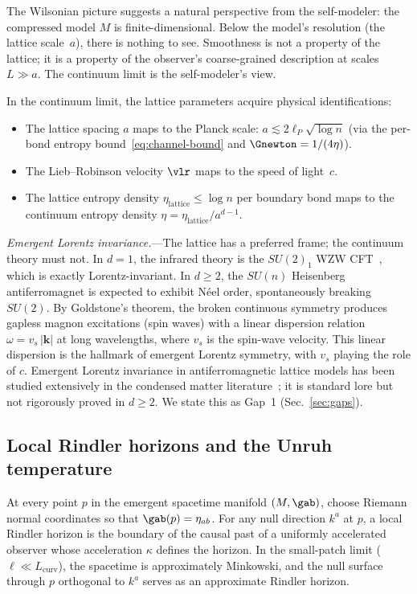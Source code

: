 The Wilsonian picture suggests a natural perspective from the
self-modeler:  the compressed model $M$ is finite-dimensional.  Below
the model's resolution (the lattice scale~$a$), there is nothing to
see.  Smoothness is not a property of the lattice; it is a property of
the observer's coarse-grained description at scales $L \gg a$.  The
continuum limit is the self-modeler's view.

In the continuum limit, the lattice parameters acquire physical
identifications:
\begin{itemize}
\item The lattice spacing $a$ maps to the Planck scale:
  $a \lesssim 2\ell_P \sqrt{\log n}$ (via the per-bond entropy
  bound~\eqref{eq:channel-bound} and
  $\Gnewton = 1/(4\eta)$).
\item The Lieb--Robinson velocity $\vlr$ maps to the speed of
  light~$c$.
\item The lattice entropy density
  $\eta_{\mathrm{lattice}} \leq \log n$ per boundary bond maps to
  the continuum entropy density
  $\eta = \eta_{\mathrm{lattice}}/a^{d-1}$.
\end{itemize}

\emph{Emergent Lorentz invariance.}---The lattice has a preferred frame;
the continuum theory must not.  In $d = 1$, the infrared theory is the
$SU(2)_1$ WZW CFT~\cite{Affleck1986, AffleckHaldane1987}, which is
exactly Lorentz-invariant.  In $d \geq 2$, the $SU(n)$ Heisenberg
antiferromagnet is expected to exhibit N\'eel order, spontaneously
breaking $SU(2)$.  By Goldstone's theorem, the broken continuous
symmetry produces gapless magnon excitations (spin waves) with a
linear dispersion relation $\omega = v_s\, |\mathbf{k}|$ at long
wavelengths, where $v_s$ is the spin-wave velocity.  This linear
dispersion is the hallmark of emergent Lorentz symmetry, with $v_s$
playing the role of $c$.  Emergent Lorentz invariance in
antiferromagnetic lattice models has been studied extensively in the
condensed matter literature~\cite{EisertCramerPlenio2010}; it is
standard lore but not rigorously proved in $d \geq 2$.  We state this
as Gap~1 (Sec.~\ref{sec:gaps}).

\subsection{Local Rindler horizons and the Unruh temperature}
\label{sec:rindler}

At every point $p$ in the emergent spacetime manifold $(M, \gab)$,
choose Riemann normal coordinates so that $\gab(p) = \eta_{ab}$.  For
any null direction $k^a$ at $p$, a local Rindler horizon is the
boundary of the causal past of a uniformly accelerated observer whose
acceleration $\kappa$ defines the horizon.  In the small-patch limit
($\ell \ll L_{\mathrm{curv}}$), the spacetime is approximately
Minkowski, and the null surface through $p$ orthogonal to $k^a$
serves as an approximate Rindler horizon.

